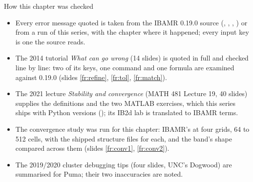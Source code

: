 \documentclass[aspectratio=169,11pt]{beamer}
\begin{document}
\begin{frame}{How this chapter was checked}
\label{fr:checked}
\begin{itemize}\footnotesize
  \item Every error message quoted is taken from the IBAMR 0.19.0 source (, , , ) or from a run of this series, with the chapter where it happened; every input key is one the source reads.
  \item The 2014 tutorial \emph{What can go wrong} (14 slides) is quoted in full and checked line by line: two of its keys, one command and one formula are examined against 0.19.0 (slides \ref{fr:refine}, \ref{fr:tol}, \ref{fr:match}).
  \item The 2021 lecture \emph{Stability and convergence} (MATH 481 Lecture 19, 40 slides) supplies the definitions and the two MATLAB exercises, which this series ships with Python versions (); its IB2d lab is translated to IBAMR terms.
  \item The convergence study was run for this chapter: IBAMR's  at four grids, 64 to 512 cells, with the shipped structure files for each, and the band's shape compared across them (slides \ref{fr:conv1}, \ref{fr:conv2}).
  \item The 2019/2020 cluster debugging tips (four slides, UNC's Dogwood) are summarised for Puma; their two inaccuracies are noted.
\end{itemize}
\end{frame}
\end{document}
